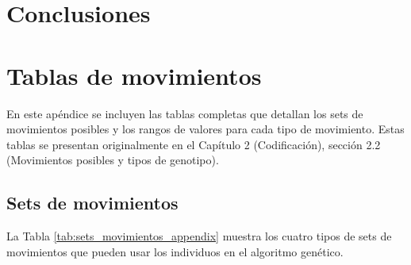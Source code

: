 \documentclass[11pt,spanish,listoffigures,listoftables]{tfgetsinf}
\begin{document}
\chapter{Conclusiones}

\cleardoublepage
\printbibliography


\APPENDIX

\chapter{Tablas de movimientos}
\label{appendix:movimientos}

En este apéndice se incluyen las tablas completas que detallan los sets de movimientos posibles y los rangos de valores para cada tipo de movimiento. Estas tablas se presentan originalmente en el Capítulo 2 (Codificación), sección 2.2 (Movimientos posibles y tipos de genotipo).

\section{Sets de movimientos}

La Tabla \ref{tab:sets_movimientos_appendix} muestra los cuatro tipos de sets de movimientos que pueden usar los individuos en el algoritmo genético.
\end{document}
